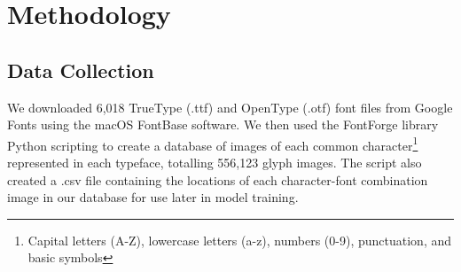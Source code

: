 \chapter{Methodology}
\label{chap:methodology}

\section{Data Collection}

We downloaded 6,018 TrueType (.ttf) and OpenType (.otf) font files from Google Fonts using the macOS FontBase software. We then used the FontForge library Python scripting to create a database of images of each common character\footnote{Capital letters (A-Z), lowercase letters (a-z), numbers (0-9), punctuation, and basic symbols} represented in each typeface, totalling 556,123 glyph images. The script also created a .csv file containing the locations of each character-font combination image in our database for use later in model training.